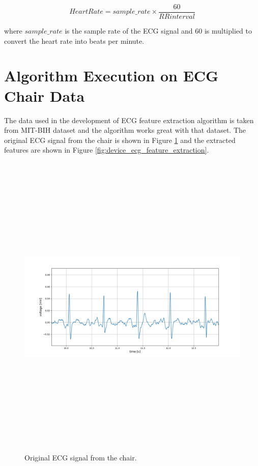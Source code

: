 \begin{equation}\label{eqn:heart_rate} 
HeartRate = sample\_rate \times \frac{60}{RR interval}
\end{equation}

where $sample\_rate$ is the sample rate of the ECG signal and 60 is multiplied to convert the heart rate into beats per minute.

\pagebreak

\section{Algorithm Execution on ECG Chair Data}
The data used in the development of ECG feature extraction algorithm is taken from MIT-BIH dataset and the algorithm works great with that dataset. The original ECG signal from the chair is shown in Figure \ref{fig:device_ecg_orignal} and the extracted features are shown in Figure \ref{fig:device_ecg_feature_extraction}.

\begin{figure}[htpb]
	\centering
	\includegraphics[width=15cm,height=15cm,keepaspectratio=true]{images/device_ecg_orignal}
	\caption{
		Original ECG signal from the chair.
	}
	\label{fig:device_ecg_orignal}
\end{figure}

